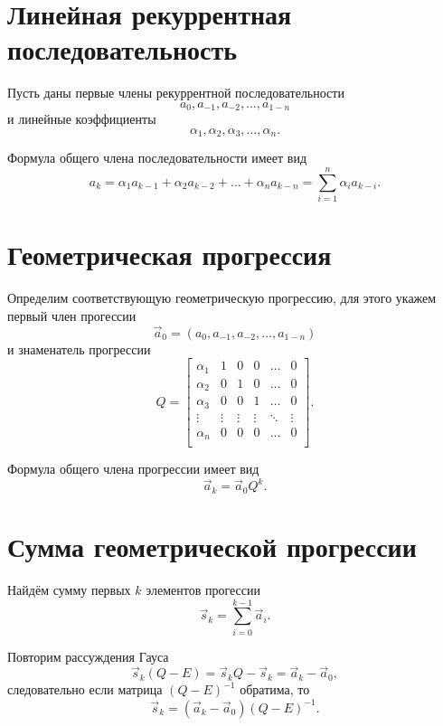 \documentclass[draft]{article}
\begin{document}
\section{Линейная рекуррентная последовательность}

Пусть даны первые члены рекуррентной последовательности
\[ a_{0}, a_{-1}, a_{-2}, \ldots, a_{1-n} \]
и линейные коэффициенты
\[ \alpha_1, \alpha_2, \alpha_3, \ldots, \alpha_n. \]

Формула общего члена последовательности имеет вид
\[ a_k = \alpha_1 a_{k-1} + \alpha_2 a_{k-2} + \ldots + \alpha_n a_{k - n} = \sum_{i=1}^{n}{\alpha_i a_{k-i}}. \]


\section{Геометрическая прогрессия}

Определим соответствующую геометрическую прогрессию, для этого укажем первый член прогессии
\[ \vec{a}_{0} = (a_{0}, a_{-1}, a_{-2}, \ldots, a_{1-n}) \]
и знаменатель прогрессии
\begin{displaymath}
  Q = \left[
  \begin{array}{cccccc}
    \alpha_1 & 1      & 0      & 0      & \ldots & 0      \\
    \alpha_2 & 0      & 1      & 0      & \ldots & 0      \\
    \alpha_3 & 0      & 0      & 1      & \ldots & 0      \\
    \vdots   & \vdots & \vdots & \vdots & \ddots & \vdots \\
    \alpha_n & 0      & 0      & 0      & \ldots & 0      \\
  \end{array}
  \right].
\end{displaymath}

Формула общего члена прогрессии имеет вид
\[ \vec{a}_k = \vec{a}_0 Q^k. \]


\section{Сумма геометрической прогрессии}

Найдём сумму первых $k$ элементов прогессии
\[ \vec{s}_k = \sum_{i=0}^{k-1}\vec{a}_i. \]

Повторим рассуждения Гауса
\[ \vec{s}_k(Q - E) = \vec{s}_k Q - \vec{s}_k = \vec{a}_k - \vec{a}_0, \]
следовательно если матрица $(Q - E)^{-1}$ обратима, то
\[ \vec{s}_k = (\vec{a}_k - \vec{a}_0) (Q - E)^{-1}. \]
\end{document}
